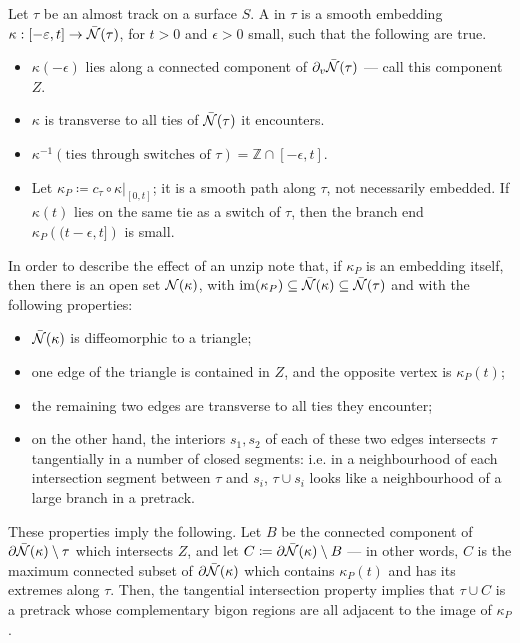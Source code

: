 \begin{defin}\label{def:zipper}
Let $\tau$ be an almost track on a surface $S$. A  in $\tau$ is a smooth embedding $\kappa:[-\varepsilon,t]\rightarrow \bar{{\mathcal N}}(\tau)$, for $t>0$ and $\epsilon>0$ small, such that the following are true.
\begin{itemize}
\item $\kappa(-\epsilon)$ lies along a connected component of $\partial_v \bar{{\mathcal N}}(\tau)$ --- call this component $Z$.
\item $\kappa$ is transverse to all ties of $\bar{{\mathcal N}}(\tau)$ it encounters.
\item $\kappa^{-1}(\text{ties through switches of }\tau)=\mathbb Z\cap [-\epsilon,t]$.
\item Let $\kappa_P\coloneqq c_\tau\circ\kappa|_{[0,t]}$; it is a smooth path along $\tau$, not necessarily embedded. If $\kappa(t)$ lies on the same tie as a switch of $\tau$, then the branch end $\kappa_P\left((t-\epsilon,t]\right)$ is small.
\end{itemize}

In order to describe the effect of an unzip note that, if $\kappa_P$ is an embedding itself, then there is an open set ${\mathcal N}(\kappa)$, with $\mathrm{im}(\kappa_P)\subseteq \bar{{\mathcal N}}(\kappa)\subseteq \bar{{\mathcal N}}(\tau)$ and with the following properties:
\begin{itemize}
\item $\bar{{\mathcal N}}(\kappa)$ is diffeomorphic to a triangle;
\item one edge of the triangle is contained in $Z$, and the opposite vertex is $\kappa_P(t)$;
\item the remaining two edges are transverse to all ties they encounter;
\item on the other hand, the interiors $s_1,s_2$ of each of these two edges intersects $\tau$ tangentially in a number of closed segments: i.e. in a neighbourhood of each intersection segment between $\tau$ and $s_i$, $\tau\cup s_i$ looks like a neighbourhood of a large branch in a pretrack.
\end{itemize}

These properties imply the following. Let $B$ be the connected component of $\partial\bar{{\mathcal N}}(\kappa)\setminus \tau$ which intersects $Z$, and let $C\coloneqq\partial\bar{{\mathcal N}}(\kappa)\setminus B$ --- in other words, $C$ is the maximum connected subset of $\partial\bar{{\mathcal N}}(\kappa)$ which contains $\kappa_P(t)$ and has its extremes along $\tau$. Then, the tangential intersection property implies that $\tau\cup C$ is a pretrack whose complementary bigon regions are all adjacent to the image of $\kappa_P$.


\end{defin}
